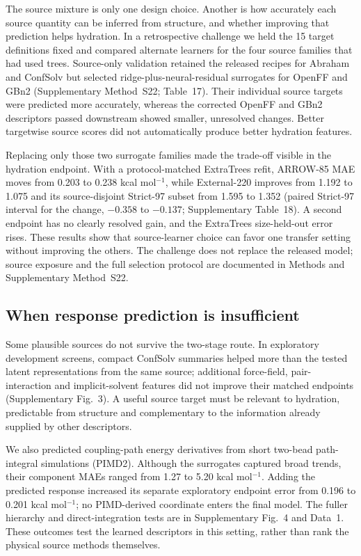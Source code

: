 \documentclass[12pt]{article}
\begin{document}
The source mixture is only one design choice. Another is how accurately each
source quantity can be inferred from structure, and whether improving that
prediction helps hydration. In a retrospective challenge we held the 15 target
definitions fixed and compared alternate learners for the four source families
that had used trees. Source-only validation retained the released recipes for
Abraham and ConfSolv but selected ridge-plus-neural-residual surrogates for
OpenFF and GBn2 (Supplementary Method~S22; Table~17). Their individual source
targets were predicted more accurately, whereas the corrected OpenFF and GBn2
descriptors passed downstream showed smaller, unresolved changes. Better
targetwise source scores did not automatically produce better hydration features.

Replacing only those two surrogate families made the trade-off visible in the
hydration endpoint. With a protocol-matched ExtraTrees refit, ARROW-85 MAE moves
from 0.203 to 0.238 kcal mol$^{-1}$, while External-220 improves from 1.192 to
1.075 and its source-disjoint Strict-97 subset from 1.595 to 1.352 (paired
Strict-97 interval for the change, $-0.358$ to $-0.137$; Supplementary
Table~18). A second endpoint has no clearly resolved gain, and the ExtraTrees
size-held-out error rises. These results show that source-learner choice can
favor one transfer setting without improving the others. The challenge does
not replace the released model; source exposure and the full selection protocol
are documented in Methods and Supplementary Method~S22.

\subsection*{When response prediction is insufficient}

Some plausible sources do not survive the two-stage route. In exploratory
development screens, compact ConfSolv summaries helped more than the tested
latent representations from the same source; additional force-field,
pair-interaction and implicit-solvent features did not improve their matched
endpoints (Supplementary Fig.~3). A useful source target must be relevant to
hydration, predictable from structure and complementary to the information
already supplied by other descriptors.

We also predicted coupling-path energy derivatives from short two-bead
path-integral simulations (PIMD2). Although the surrogates captured broad
trends, their component MAEs ranged from 1.27 to 5.20 kcal mol$^{-1}$.
Adding the predicted response increased its separate exploratory endpoint
error from 0.196 to 0.201 kcal mol$^{-1}$; no PIMD-derived coordinate enters
the final model. The fuller hierarchy and direct-integration tests are in
Supplementary Fig.~4 and Data~1. These outcomes test the learned descriptors
in this setting, rather than rank the physical source methods themselves.
\end{document}
